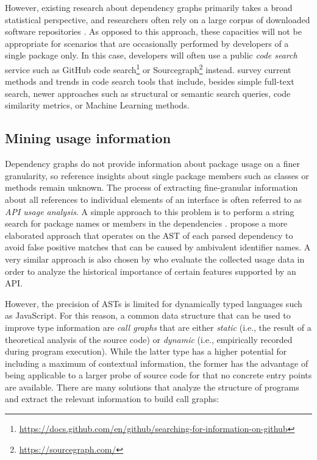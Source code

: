 However, existing research about dependency graphs primarily takes a broad statistical perspective, and researchers often rely on a large corpus of downloaded software repositories \citep{abdalkareem2017developers,katz2020libraries,kikas2017structure}.
As opposed to this approach, these capacities will not be appropriate for scenarios that are occasionally performed by developers of a single package only.
In this case, developers will often use a public \emph{code search} service such as GitHub code search\footnote{\url{https://docs.github.com/en/github/searching-for-information-on-github}} or Sourcegraph\footnote{\url{https://sourcegraph.com/}} instead.
\citet{liu2020opportunities} survey current methods and trends in code search tools that include, besides simple full-text search, newer approaches such as structural or semantic search queries, code similarity metrics, or Machine Learning methods.

\subsection{Mining usage information}
\label{sec:related_work/usage_information}

Dependency graphs do not provide information about package usage on a finer granularity, so reference insights about single package members such as classes or methods remain unknown.
The process of extracting fine-granular information about all references to individual elements of an interface is often referred to as \emph{API usage analysis}.
A simple approach to this problem is to perform a string search for package names or members in the dependencies \citep{mileva2010mining}.
\citet{qiu2016understanding} propose a more elaborated approach that operates on the AST of each parsed dependency to avoid false positive matches that can be caused by ambivalent identifier names.
A very similar approach is also chosen by \citet{sawant2017fine} who evaluate the collected usage data in order to analyze the historical importance of certain features supported by an API.

However, the precision of ASTs is limited for dynamically typed languages such as JavaScript.
For this reason, a common data structure that can be used to improve type information are \emph{call graphs} that are either \emph{static} (i.e., the result of a theoretical analysis of the source code) or \emph{dynamic} (i.e., empirically recorded during program execution).
While the latter type has a higher potential for including a maximum of contextual information, the former has the advantage of being applicable to a larger probe of source code for that no concrete entry points are available.
There are many solutions that analyze the structure of programs and extract the relevant information to build call graphs:

